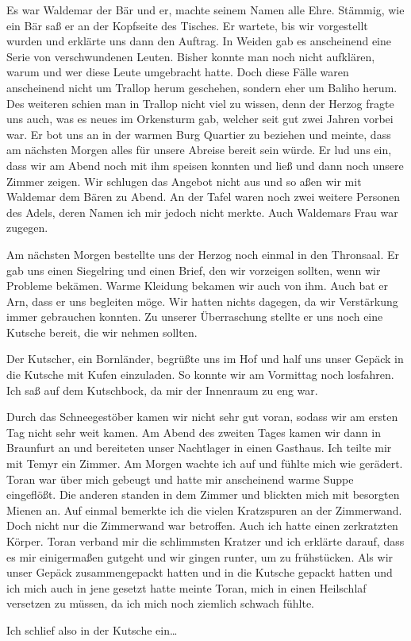 Es war Waldemar der Bär und er, machte seinem Namen alle Ehre. Stämmig, wie ein Bär saß er an der Kopfseite des Tisches. Er wartete, bis wir vorgestellt wurden und erklärte uns dann den Auftrag. In Weiden gab es anscheinend eine Serie von verschwundenen Leuten. Bisher konnte man noch nicht aufklären, warum und wer diese Leute umgebracht hatte. Doch diese Fälle waren anscheinend nicht um Trallop herum geschehen, sondern eher um Baliho herum. Des weiteren schien man in Trallop nicht viel zu wissen, denn der Herzog fragte uns auch, was es neues im Orkensturm gab, welcher seit gut zwei Jahren vorbei war. Er bot uns an in der warmen Burg Quartier zu beziehen und meinte, dass am nächsten Morgen alles für unsere Abreise bereit sein würde. Er lud uns ein, dass wir am Abend noch mit ihm speisen konnten und ließ und dann noch unsere Zimmer zeigen. Wir schlugen das Angebot nicht aus und so aßen wir mit Waldemar dem Bären zu Abend. An der Tafel waren noch zwei weitere Personen des Adels, deren Namen ich mir jedoch nicht merkte. Auch Waldemars Frau war zugegen.\par
Am nächsten Morgen bestellte uns der Herzog noch einmal in den Thronsaal. Er gab uns einen Siegelring und einen Brief, den wir vorzeigen sollten, wenn wir Probleme bekämen. Warme Kleidung bekamen wir auch von ihm. Auch bat er Arn, dass er uns begleiten möge. Wir hatten nichts dagegen, da wir Verstärkung immer gebrauchen konnten. Zu unserer Überraschung stellte er uns noch eine Kutsche bereit, die wir nehmen sollten.\par
Der Kutscher, ein Bornländer, begrüßte uns im Hof und half uns unser Gepäck in die Kutsche mit Kufen einzuladen. So konnte wir am Vormittag noch losfahren. Ich saß auf dem Kutschbock, da mir der Innenraum zu eng war.\par
Durch das Schneegestöber kamen wir nicht sehr gut voran, sodass wir am ersten Tag nicht sehr weit kamen. Am Abend des zweiten Tages kamen wir dann in Braunfurt an und bereiteten unser Nachtlager in einen Gasthaus. Ich teilte mir mit Temyr ein Zimmer. Am Morgen wachte ich auf und fühlte mich wie gerädert. Toran war über mich gebeugt und hatte mir anscheinend warme Suppe eingeflößt. Die anderen standen in dem Zimmer und blickten mich mit besorgten Mienen an. Auf einmal bemerkte ich die vielen Kratzspuren an der Zimmerwand. Doch nicht nur die Zimmerwand war betroffen. Auch ich hatte einen zerkratzten Körper. Toran verband mir die schlimmsten Kratzer und ich erklärte darauf, dass es mir einigermaßen gutgeht und wir gingen runter, um zu frühstücken. Als wir unser Gepäck zusammengepackt hatten und in die Kutsche gepackt hatten und ich mich auch in jene gesetzt hatte meinte Toran, mich in einen Heilschlaf versetzen zu müssen, da ich mich noch ziemlich schwach fühlte.\par
Ich schlief also in der Kutsche ein\dots 

